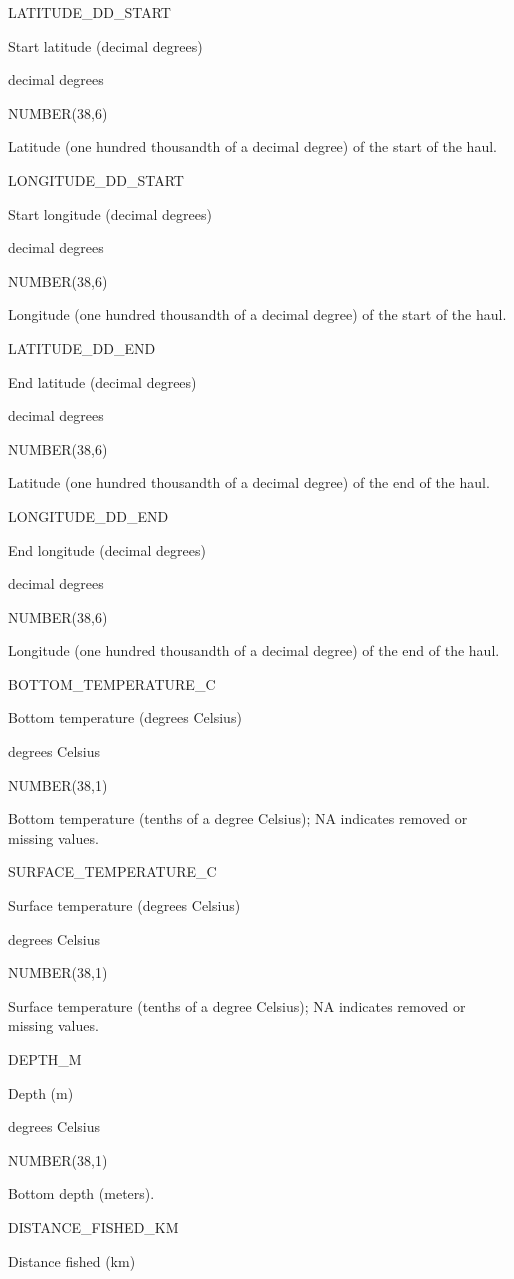 \documentclass[
  letterpaper,
  oneside,
  open=any]{scrbook}
\begin{document}
LATITUDE\_DD\_START

Start latitude (decimal degrees)

decimal degrees

NUMBER(38,6)

Latitude (one hundred thousandth of a decimal degree) of the start of
the haul.

LONGITUDE\_DD\_START

Start longitude (decimal degrees)

decimal degrees

NUMBER(38,6)

Longitude (one hundred thousandth of a decimal degree) of the start of
the haul.

LATITUDE\_DD\_END

End latitude (decimal degrees)

decimal degrees

NUMBER(38,6)

Latitude (one hundred thousandth of a decimal degree) of the end of the
haul.

LONGITUDE\_DD\_END

End longitude (decimal degrees)

decimal degrees

NUMBER(38,6)

Longitude (one hundred thousandth of a decimal degree) of the end of the
haul.

BOTTOM\_TEMPERATURE\_C

Bottom temperature (degrees Celsius)

degrees Celsius

NUMBER(38,1)

Bottom temperature (tenths of a degree Celsius); NA indicates removed or
missing values.

SURFACE\_TEMPERATURE\_C

Surface temperature (degrees Celsius)

degrees Celsius

NUMBER(38,1)

Surface temperature (tenths of a degree Celsius); NA indicates removed
or missing values.

DEPTH\_M

Depth (m)

degrees Celsius

NUMBER(38,1)

Bottom depth (meters).

DISTANCE\_FISHED\_KM

Distance fished (km)
\end{document}
